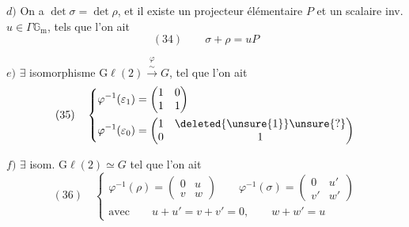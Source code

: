 $d)$ On a $\det\sigma=\det\rho$, et il existe un projecteur élémentaire $P$ et un scalaire inv. $u\in\Gamma\mathbb G_{\mathrm m}$, tels que l'on ait
\[
(34)\qquad \sigma+\rho=uP
\]




$e)$ $\exists$ isomorphisme $\mathrm{G}\ell(2)\overset{\varphi}{\xrightarrow{\sim}}G$,  tel que l'on ait
\[
(35)\quad\left\{\begin{aligned}
\varphi^{-1}(\varepsilon_1)&=\begin{pmatrix}1&0\\1&1\end{pmatrix}\\
\varphi^{-1}(\varepsilon_0)&=\begin{pmatrix}1&\deleted{\unsure{1}}\unsure{?}\\0&1\end{pmatrix}
\end{aligned}\right.
\]

$f)$ $\exists$ isom. $\mathrm{G}\ell(2)\simeq G$ tel que l'on ait
\[
(36)\quad\left\{\begin{gathered}
\varphi^{-1}(\rho)=\begin{pmatrix}0&u\\v&w\end{pmatrix}\qquad
\varphi^{-1}(\sigma)=\begin{pmatrix}0&u'\\v'&w'\end{pmatrix}\\
\text{avec}\qquad u+u'=v+v'=0,\qquad w+w'=u
\end{gathered}\right.
\]

